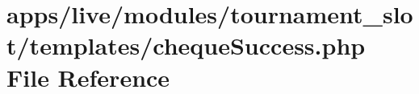 \hypertarget{live_2modules_2tournament__slot_2templates_2cheque_success_8php}{\section{apps/live/modules/tournament\-\_\-slot/templates/cheque\-Success.php File Reference}
\label{live_2modules_2tournament__slot_2templates_2cheque_success_8php}
}
